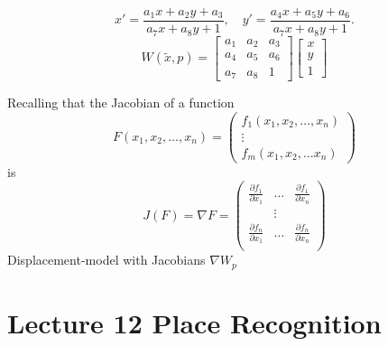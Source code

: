 \documentclass[a4paper,12 pt]{article}
\theoremstyle{definition}
\theoremstyle{remark}
\theoremstyle{definition}
\theoremstyle{definition}
\theoremstyle{definition}
\theoremstyle{definition}
\theoremstyle{remark}
\theoremstyle{remark}
\theoremstyle{definition}
\theoremstyle{definition}
\begin{document}
\begin{itemize}
\begin{equation}
x'=\frac{a_1x+a_2y+a_3}{a_7x+a_8y+1} , \quad y'=\frac{a_4x+a_5y+a_6}{a_7x+a_8y+1}.
\end{equation}
\begin{equation}
W(\tilde{x},p) = \begin{bmatrix}
a_1 &a_2& a_3\\
a_4& a_5 &a_6 \\
a_7 &a_8& 1
\end{bmatrix}
\begin{bmatrix}
x\\
y\\ 
1
\end{bmatrix}
\end{equation}
\end{itemize}
Recalling that the Jacobian of a function 
\begin{equation}
F(x_1,x_2,\hdots,x_n)=\begin{pmatrix}
f_1(x_1,x_2,\hdots,x_n)\\
\vdots \\
f_m(x_1,x_2,\hdots x_n)
\end{pmatrix}
\end{equation}
is
\begin{equation}
J(F)=\nabla F= \begin{pmatrix}
 \frac{\partial f_1}{\partial x_1}&\hdots & \frac{\partial f_1}{\partial x_n}\\
 &\vdots&\\
  \frac{\partial f_n}{\partial x_1}&\hdots & \frac{\partial f_n}{\partial x_n}\\
 \end{pmatrix}
\end{equation}
Displacement-model with Jacobians $\nabla W_p$
\newpage
\section*{Lecture 12 Place Recognition}
\end{document}
